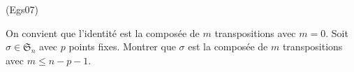 \begin{tiny}(Egs07)\end{tiny} On convient que l'identité est la composée de $m$ transpositions avec $m=0$. Soit $\sigma \in\mathfrak{S}_n$ avec $p$ points fixes. Montrer que $\sigma$ est la composée de $m$ transpositions avec $m \leq n-p-1$.